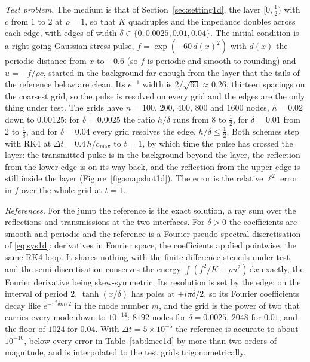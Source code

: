 \documentclass[11pt]{amsart}
\theoremstyle{definition}
\theoremstyle{remark}
\newcommand{\para}[1]{\par\smallskip\noindent\textit{#1}.\enspace}
\begin{document}
\para{Test problem}
The medium is that of Section~\ref{sec:setting1d}, the layer $[0,
\tfrac12)$ with $c$ from $1$ to $2$ at $\rho = 1$, so that $K$ quadruples
and the impedance doubles across each edge, with edges of width $\delta
\in \{0, 0.0025, 0.01, 0.04\}$. The initial condition is a right-going
Gaussian stress pulse, $f = \exp(-60\, d(x)^2)$ with $d(x)$ the periodic
distance from $x$ to $-0.6$ (so $f$ is periodic and smooth to rounding)
and $u = -f / \rho c$, started in the background far enough from the
layer that the tails of the reference below are clean. Its $e^{-1}$ width is $2 / \sqrt{60}
\approx 0.26$, thirteen spacings on the coarsest grid, so the pulse is
resolved on every grid and the edges are the only thing under test. The
grids have $n = 100$, $200$, $400$, $800$ and $1600$ nodes, $h = 0.02$
down to $0.00125$; for $\delta = 0.0025$ the ratio $h / \delta$ runs from
$8$ to $\tfrac12$, for $\delta = 0.01$ from $2$ to $\tfrac18$, and for
$\delta = 0.04$ every grid resolves the edge, $h / \delta \le \tfrac12$.
Both schemes step with RK4 at $\Delta t = 0.4\, h / c_{\max}$ to $t = 1$,
by which time the pulse has crossed the layer: the transmitted pulse is
in the background beyond the layer, the reflection from the lower edge
is on its way back, and the reflection from the upper edge is still
inside the layer (Figure~\ref{fig:snapshot1d}). The error is the relative
$\ell^2$ error in $f$ over the whole grid at $t = 1$.

\para{References}
For the jump the reference is the exact solution, a ray sum over the
reflections and transmissions at the two interfaces.
For $\delta > 0$ the coefficients are smooth and periodic and the
reference is a Fourier pseudo-spectral discretisation of
\eqref{eq:sys1d}: derivatives in Fourier space, the coefficients applied
pointwise, the same RK4 loop. It shares nothing with the finite-difference
stencils under test, and the semi-discretisation conserves the energy
$\int (f^2 / K + \rho u^2)\, \mathrm{d}x$ exactly, the Fourier derivative
being skew-symmetric. Its resolution is set by the edge: on the interval
of period $2$, $\tanh(x / \delta)$ has poles at $\pm i \pi \delta / 2$,
so its Fourier coefficients decay like $e^{-\pi^2 \delta m / 2}$ in the
mode number $m$, and the grid is the power of two that carries every mode
down to $10^{-14}$: $8192$ nodes for $\delta = 0.0025$, $2048$ for
$0.01$, and the floor of $1024$ for $0.04$. With $\Delta t = 5 \times
10^{-5}$ the reference is accurate to about $10^{-10}$, below every error
in Table~\ref{tab:knee1d} by more than two orders of magnitude, and is
interpolated to the test grids trigonometrically.
\end{document}
